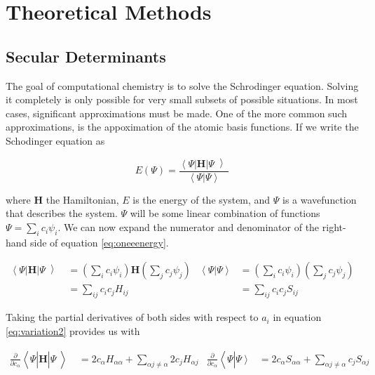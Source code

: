 \chapter{Theoretical Methods} \label{theoreticalMethods}

\section{Secular Determinants}

The goal of computational chemistry is to solve the Schrodinger equation.
Solving it completely is only possible for very small subsets of possible situations.
In most cases, significant approximations must be made.
One of the more common such approximations, is the appoximation of the atomic basis functions.
If we write the Schodinger equation as

\begin{equation} \label{eq:oneeenergy}
E(\Psi) = \frac{\left<\right.\Psi\left|\right.\bm{H}\left.\right|\Psi\left>\right.}{\left<\right.\Psi\left.\right|\left.\Psi\left.\right.\right>}
\end{equation}

where $\mathbf{H}$ the Hamiltonian, $E$ is the energy of the
system, and $\Psi$ is a wavefunction that describes the system.
$\Psi$ will be some linear combination of functions $\Psi=\sum_{i}c_i\psi_i$.
We can now expand the numerator and denominator of the right-hand side of equation \ref{eq:oneeenergy}.

\begin{align}
  \label{eq:variation1}
  \left<\right.\Psi\left|\right.\bm{H}\left.\right|\Psi\left>\right.&=
								      \left( \sum_{i} c_i \psi_i \right) \mathbf{H} \left( \sum_j c_j \psi_j \right) &
																		       \left<\right.\Psi\left.\right|\left.\Psi\left.\right.\right>&=
																										     \left( \sum_{i} c_i \psi_i \right) \left( \sum_j c_j \psi_j \right)  \\
								    &= \sum_{ij} c_{i}c_j H_{ij} & &= \sum_{ij} c_{i}c_j S_{ij} 
  \label{eq:variation2}
\end{align}

Taking the partial derivatives of both sides with respect to $a_i$ in
equation \ref{eq:variation2} provides us with

\begin{align}
  \label{eq:variationexpansion}
  \frac{\partial}{\partial c_{\alpha}}
  \left<\right.\Psi\left|\right.\bm{H}\left.\right|\Psi\left>\right.&=
								      2c_\alpha H_{\alpha \alpha} + \sum_{\alpha j \neq \alpha} 2c_j H_{\alpha j} &
																		    \frac{\partial}{\partial c_{\alpha}}
																		    \left<\right.\Psi\left.\right|\left.\Psi\left.\right.\right>&=
																										  2 c_\alpha S_{\alpha\alpha} + \sum_{\alpha j \neq \alpha} c_j S_{\alpha j}
\end{align}


